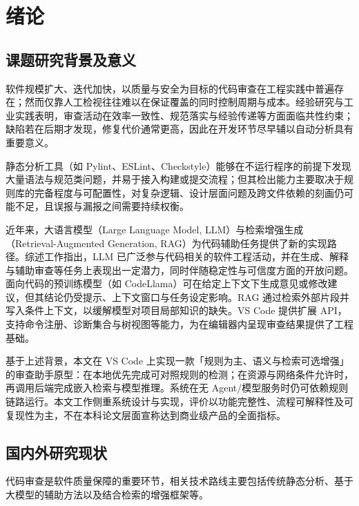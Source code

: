 
\section{绪论}
\subsection{课题研究背景及意义}
软件规模扩大、迭代加快，以质量与安全为目标的代码审查在工程实践中普遍存在；然而仅靠人工检视往往难以在保证覆盖的同时控制周期与成本。经验研究与工业实践表明，审查活动在效率一致性、规范落实与经验传递等方面面临共性约束\cite{bacchelli2013expectations}；缺陷若在后期才发现，修复代价通常更高，因此在开发环节尽早辅以自动分析具有重要意义\cite{sadowski2018scaling}。

静态分析工具（如 Pylint、ESLint、Checkstyle）能够在不运行程序的前提下发现大量语法与规范类问题，并易于接入构建或提交流程；但其检出能力主要取决于规则库的完备程度与可配置性，对复杂逻辑、设计层面问题及跨文件依赖的刻画仍可能不足，且误报与漏报之间需要持续权衡\cite{sadowski2018scaling,bacchelli2013expectations}。

近年来，大语言模型（Large Language Model, LLM）与检索增强生成（Retrieval-Augmented Generation, RAG）为代码辅助任务提供了新的实现路径。综述工作指出，LLM 已广泛参与代码相关的软件工程活动，并在生成、解释与辅助审查等任务上表现出一定潜力，同时伴随稳定性与可信度方面的开放问题\cite{hou2024llmse,zhang2024surveyllmse}。面向代码的预训练模型（如 CodeLlama）可在给定上下文下生成意见或修改建议，但其结论仍受提示、上下文窗口与任务设定影响\cite{roziere2023codellama}。RAG 通过检索外部片段并写入条件上下文，以缓解模型对项目局部知识的缺失\cite{lewis2020retrieval}。VS Code 提供扩展 API，支持命令注册、诊断集合与树视图等能力，为在编辑器内呈现审查结果提供了工程基础\cite{microsoft2025vscodeapi}。

基于上述背景，本文在 VS Code 上实现一款「规则为主、语义与检索可选增强」的审查助手原型：在本地优先完成可对照规则的检测；在资源与网络条件允许时，再调用后端完成嵌入检索与模型推理。系统在无 Agent/模型服务时仍可依赖规则链路运行。本文工作侧重系统设计与实现，评价以功能完整性、流程可解释性及可复现性为主，不在本科论文层面宣称达到商业级产品的全面指标。

\subsection{国内外研究现状}
代码审查是软件质量保障的重要环节，相关技术路线主要包括传统静态分析、基于大模型的辅助方法以及结合检索的增强框架等。

